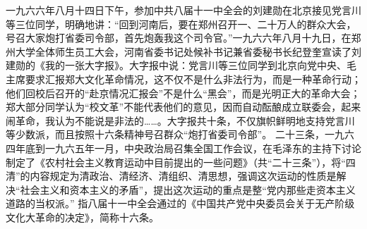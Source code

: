 \begin{maonote}
一九六六年八月十四日下午，参加中共八届十一中全会的刘建勋在北京接见党言川等三位同学，明确地讲：“回到河南后，要在郑州召开一、二十万人的群众大会，号召大家炮打省委司令部，首先炮轰我这个司令官。”一九六六年八月十九日，在郑州大学全体师生员工大会，河南省委书记处候补书记兼省委秘书长纪登奎宣读了刘建勋的《我的一张大字报》。大字报中说：党言川等三位同学到北京向党中央、毛主席要求汇报郑大文化革命情况，这不仅不是什么非法行为，而是一种革命行动；他们回校后召开的“赴京情况汇报会”不是什么“黑会”，而是光明正大的革命大会；郑大部分同学认为“校文革”不能代表他们的意见，因而自动酝酿成立联委会，起来闹革命，我认为不能说是非法的……。大字报共十条，不仅旗帜鲜明地支持党言川等少数派，而且按照十六条精神号召群众“炮打省委司令部”。
二十三条，一九六四年底到一九六五年一月，中央政治局召集全国工作会议，在毛泽东的主持下讨论制定了《农村社会主义教育运动中目前提出的一些问题》（共“二十三条”），将“四清”的内容规定为清政治、清经济、清组织、清思想，强调这次运动的性质是解决“社会主义和资本主义的矛盾”，提出这次运动的重点是整“党内那些走资本主义道路的当权派。”
指八届十一中全会通过的《中国共产党中央委员会关于无产阶级文化大革命的决定》，简称十六条。
\end{maonote}
